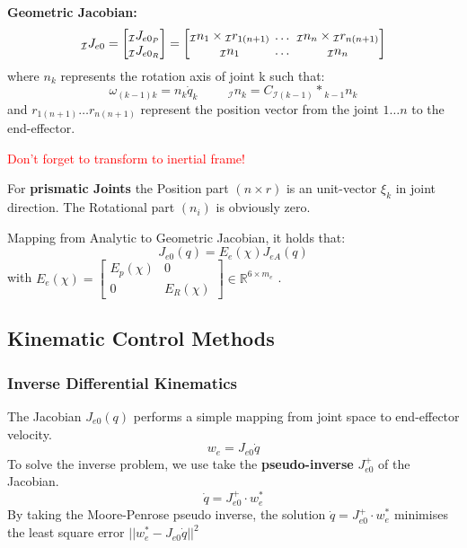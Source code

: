 \documentclass[fontsize=6pt,DIV=calc,a4paper,ngerman]{scrartcl}
\begin{document}
\begin{multicols*}{4}
	\smallskip
	\textbf{Geometric Jacobian:}
	$$ {}_\mathcal{I}J_{e0} =
		\begin{bmatrix}{}
			{}_\mathcal{I}J_{e0_P} \\ {}_\mathcal{I}J_{e0_R}
		\end{bmatrix}
		=
		\setlength\arraycolsep{2pt}
		\begin{bmatrix}{}
			{}_\mathcal{I}n_1 \times {}_\mathcal{I}r_{1(n+1)} & \dots & {}_\mathcal{I}n_n \times {}_\mathcal{I}r_{n(n+1)} \\
			{}_\mathcal{I}n_1                                 & \dots & {}_\mathcal{I}n_n
		\end{bmatrix}$$
	where $n_k$ represents the rotation axis of joint k such that:
	$$\omega_{(k-1)k} = n_k \dot{q}_k \hspace{1cm} {}_\mathcal{I}n_k = C_{\mathcal{I}(k-1)} * {}_{k-1}n_k$$
	and $r_{1(n+1)} \dots r_{n(n+1)}$ represent the position vector from the joint $1 \dots n$ to the end-effector.

	\textcolor{red}{Don't forget to transform to inertial frame!}

	\smallskip
	For \textbf{prismatic Joints}  the Position part $(n\times r)$ is an unit-vector $\xi_k$ in joint direction. The Rotational part $(n_i)$ is obviously zero.

	\smallskip
	Mapping from Analytic to Geometric Jacobian, it holds that:
	$$J_{e0}(q) = E_e(\chi)J_{eA}(q)$$
	with $E_e(\chi) = \left[\begin{smallmatrix}
				E_p(\chi) & 0 \\
				0 & E_R(\chi)
			\end{smallmatrix}\right] \in \mathbb{R}^{6 \times m_e}$ .

	\subsection{Kinematic Control Methods}
	\subsubsection{Inverse Differential Kinematics}
	The Jacobian $J_{e0}(q)$  performs a simple mapping from joint space to end-effector velocity.
	$$w_e=J_{e0}\dot{q}$$
	To solve the inverse problem, we use take the \textbf{pseudo-inverse} $J_{e0}^+$ of the Jacobian.
	$$\dot{q} = J_{e0}^+ \cdot w_e^*$$
	By taking the Moore-Penrose pseudo inverse, the solution $\dot{q} = J_{e0}^+ \cdot w_e^*$ minimises the least square error $||w_e^*-J_{e0}\dot{q}||^2$


\end{multicols*}
\end{document}
